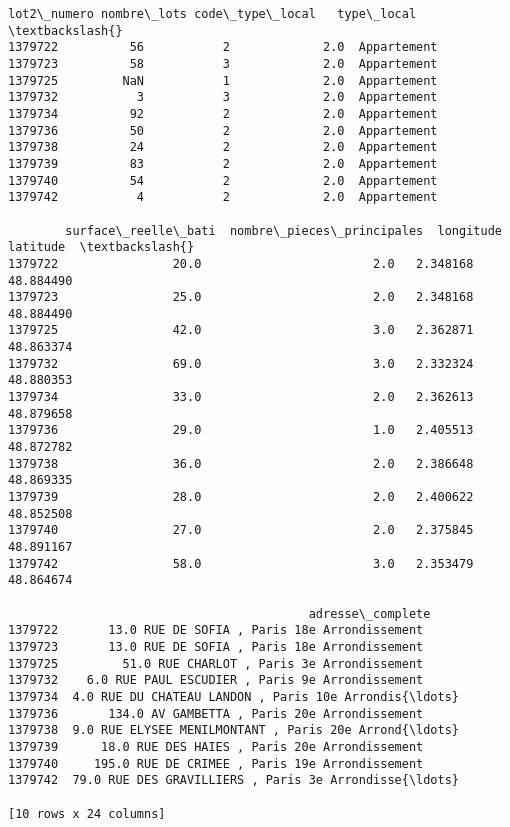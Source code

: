 \documentclass[11pt]{article}
\begin{document}
\begin{tcolorbox}[breakable, size=fbox, boxrule=.5pt, pad at break*=1mm, opacityfill=0]
\begin{Verbatim}[commandchars=\\\{\}]
        lot2\_numero nombre\_lots code\_type\_local   type\_local  \textbackslash{}
1379722          56           2             2.0  Appartement
1379723          58           3             2.0  Appartement
1379725         NaN           1             2.0  Appartement
1379732           3           3             2.0  Appartement
1379734          92           2             2.0  Appartement
1379736          50           2             2.0  Appartement
1379738          24           2             2.0  Appartement
1379739          83           2             2.0  Appartement
1379740          54           2             2.0  Appartement
1379742           4           2             2.0  Appartement

        surface\_reelle\_bati  nombre\_pieces\_principales  longitude   latitude  \textbackslash{}
1379722                20.0                        2.0   2.348168  48.884490
1379723                25.0                        2.0   2.348168  48.884490
1379725                42.0                        3.0   2.362871  48.863374
1379732                69.0                        3.0   2.332324  48.880353
1379734                33.0                        2.0   2.362613  48.879658
1379736                29.0                        1.0   2.405513  48.872782
1379738                36.0                        2.0   2.386648  48.869335
1379739                28.0                        2.0   2.400622  48.852508
1379740                27.0                        2.0   2.375845  48.891167
1379742                58.0                        3.0   2.353479  48.864674

                                          adresse\_complete
1379722       13.0 RUE DE SOFIA , Paris 18e Arrondissement
1379723       13.0 RUE DE SOFIA , Paris 18e Arrondissement
1379725         51.0 RUE CHARLOT , Paris 3e Arrondissement
1379732    6.0 RUE PAUL ESCUDIER , Paris 9e Arrondissement
1379734  4.0 RUE DU CHATEAU LANDON , Paris 10e Arrondis{\ldots}
1379736       134.0 AV GAMBETTA , Paris 20e Arrondissement
1379738  9.0 RUE ELYSEE MENILMONTANT , Paris 20e Arrond{\ldots}
1379739      18.0 RUE DES HAIES , Paris 20e Arrondissement
1379740     195.0 RUE DE CRIMEE , Paris 19e Arrondissement
1379742  79.0 RUE DES GRAVILLIERS , Paris 3e Arrondisse{\ldots}

[10 rows x 24 columns]
\end{Verbatim}
\end{tcolorbox}
        
\end{document}

